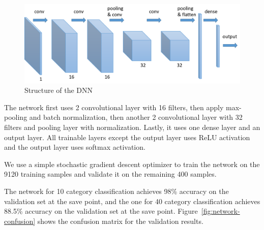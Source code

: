 \documentclass[journal]{IEEEtran}
\begin{document}
\begin{figure}[h]
	\centering
	\includegraphics[width=\linewidth]{fig/network.png}
	\caption{Structure of the DNN}
	\label{fig:network}
\end{figure}

The network first uses 2 convolutional layer with 16 filters, then apply max-pooling and batch normalization, then another 2 convolutional layer with 32 filters and pooling layer with normalization. Lastly, it uses one dense layer and an output layer. All trainable layers except the output layer uses ReLU activation and the output layer uses softmax activation.

We use a simple stochastic gradient descent optimizer to train the network on the 9120 training samples and validate it on the remaining 400 samples.

The network for 10 category classification achieves 98\% accuracy on the validation set at the save point, and the one for 40 category classification achieves 88.5\% accuracy on the validation set at the save point.
Figure~\ref{fig:network-confusion} shows the confusion matrix for the validation results.
\end{document}
